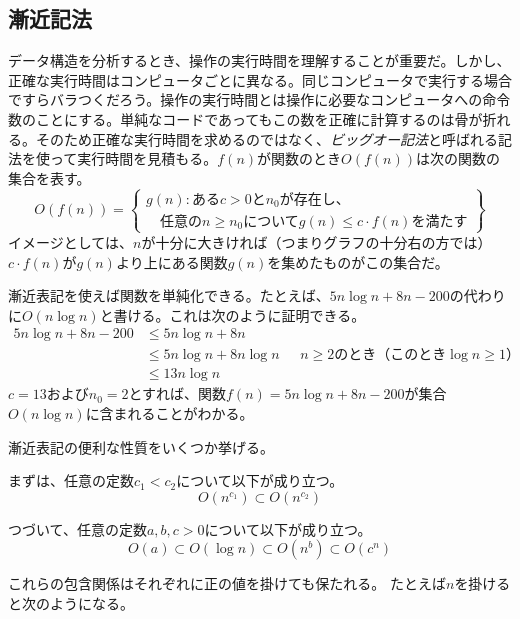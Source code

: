 \subsection{漸近記法}

  
データ構造を分析するとき、操作の実行時間を理解することが重要だ。しかし、正確な実行時間はコンピュータごとに異なる。同じコンピュータで実行する場合ですらバラつくだろう。操作の実行時間とは操作に必要なコンピュータへの命令数のことにする。単純なコードであってもこの数を正確に計算するのは骨が折れる。そのため正確な実行時間を求めるのではなく、\emph{ビッグオー記法}と呼ばれる記法を使って実行時間を見積もる。$f(n)$が関数のとき$O(f(n))$は次の関数の集合を表す。
\[
   O(f(n)) = \left\{
     \begin{array}{l}
       g(n):\mbox{ある$c>0$と$n_0$が存在し、} \\
             \quad\mbox{任意の$n\ge n_0$について$g(n) \le c\cdot f(n)$を満たす}
     \end{array} \right\}
\]
イメージとしては、$n$が十分に大きければ（つまりグラフの十分右の方では）$c\cdot f(n)$が$g(n)$より上にある関数$g(n)$を集めたものがこの集合だ。 %

漸近表記を使えば関数を単純化できる。たとえば、$5n\log n + 8n - 200$の代わりに$O(n \log n)$と書ける。これは次のように証明できる。
\begin{align*}
       5n\log n + 8n - 200
        & \le 5n\log n + 8n \\
        & \le 5n\log n + 8n\log n & \mbox{ $n\ge 2$のとき（このとき$\log n \ge 1$）}
            \\
        & \le 13n\log n
\end{align*}
$ c = 13 $および$ n_0 = 2 $とすれば、関数$ f(n)= 5n \log n + 8n-200 $が集合$ O(n \log n)$に含まれることがわかる。

漸近表記の便利な性質をいくつか挙げる。

まずは、任意の定数$c_1 < c_2$について以下が成り立つ。
\[ O(n^{c_1}) \subset O(n^{c_2}) \]

つづいて、任意の定数$ a, b, c> 0 $について以下が成り立つ。
\[ O(a) \subset O(\log n) \subset O(n^{b}) \subset O({c}^n) \]

これらの包含関係はそれぞれに正の値を掛けても保たれる。
たとえば$n$を掛けると次のようになる。

